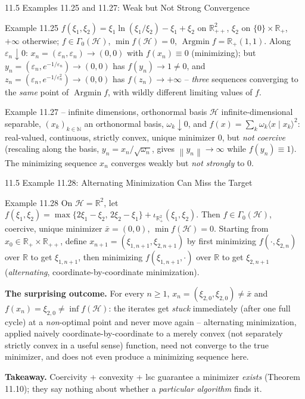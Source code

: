 \documentclass[aspectratio=169,10pt]{beamer}
\newcommand{\mHH}{\mathcal H}
\newcommand{\inner}[2]{\langle #1 \mid #2 \rangle}
\newcommand{\norm}[1]{\left\|#1\right\|}
\newcommand{\R}{\mathbb{R}}
\newcommand{\Rp}{\mathbb{R}_{+}}
\newcommand{\Rpp}{\mathbb{R}_{++}}
\newcommand{\Argmin}{\operatorname{Argmin}}
\newcommand{\GamZero}{\Gamma_0(\mHH)}
\begin{document}
\begin{frame}{11.5 Examples 11.25 and 11.27: Weak but Not Strong Convergence}

  \begin{block}{Example 11.25}
    $f(\xi_1,\xi_2)=\xi_1\ln(\xi_1/\xi_2)-\xi_1+\xi_2$ on
    $\R_{++}^2$, $\xi_2$ on $\{0\}\times\Rp$, $+\infty$ otherwise;
    $f\in\GamZero$, $\min f(\mHH)=0$, $\Argmin f=\Rp(1,1)$. Along
    $\varepsilon_n\downarrow0$: $x_n=(\varepsilon_n,\varepsilon_n)\to(0,0)$
    with $f(x_n)\equiv0$ (minimizing); but
    $y_n=(\varepsilon_n,e^{-1/\varepsilon_n})\to(0,0)$ has
    $f(y_n)\to1\neq0$, and $z_n=(\varepsilon_n,e^{-1/\varepsilon_n^2})\to(0,0)$
    has $f(z_n)\to+\infty$ -- \emph{three} sequences converging to the
    \emph{same} point of $\Argmin f$, with wildly different limiting
    values of $f$.
  \end{block}

  \begin{block}{Example 11.27 -- infinite dimensions, orthonormal basis}
    $\mHH$ infinite-dimensional separable, $(x_k)_{k\in\mathbb N}$ an
    orthonormal basis, $\omega_k\downarrow0$, and
    $f(x)=\sum_k\omega_k\inner{x}{x_k}^2$: real-valued, continuous,
    strictly convex, unique minimizer $0$, but \emph{not coercive}
    (rescaling along the basis, $y_n=x_n/\sqrt{\omega_n}$, gives
    $\norm{y_n}\to\infty$ while $f(y_n)\equiv1$). The minimizing
    sequence $x_n$ converges weakly but \emph{not strongly} to $0$.
  \end{block}

\end{frame}

\begin{frame}{11.5 Example 11.28: Alternating Minimization Can Miss the Target}

  \begin{block}{Example 11.28}
    On $\mHH=\R^2$, let
    $f(\xi_1,\xi_2)=\max\{2\xi_1-\xi_2,\,2\xi_2-\xi_1\}+\iota_{\Rp^2}(\xi_1,\xi_2)$.
    Then $f\in\GamZero$, coercive, unique minimizer $\bar x=(0,0)$,
    $\min f(\mHH)=0$. Starting from $x_0\in\Rp\times\Rpp$, define
    $x_{n+1}=(\xi_{1,n+1},\xi_{2,n+1})$ by first minimizing
    $f(\cdot,\xi_{2,n})$ over $\R$ to get $\xi_{1,n+1}$, then
    minimizing $f(\xi_{1,n+1},\cdot)$ over $\R$ to get $\xi_{2,n+1}$
    (\emph{alternating}, coordinate-by-coordinate minimization).
  \end{block}

  \textbf{The surprising outcome.} For every $n\ge1$,
  $x_n=(\xi_{2,0},\xi_{2,0})\neq\bar x$ and
  $f(x_n)=\xi_{2,0}\neq\inf f(\mHH)$: the iterates get \emph{stuck}
  immediately (after one full cycle) at a \emph{non}-optimal point
  and never move again -- alternating minimization, applied naively
  coordinate-by-coordinate to a merely convex (not separately strictly
  convex in a useful sense) function, need not converge to the true
  minimizer, and does not even produce a minimizing sequence here.

  \textbf{Takeaway.} Coercivity + convexity + lsc guarantee a
  minimizer \emph{exists} (Theorem 11.10); they say nothing about
  whether a \emph{particular algorithm} finds it.

\end{frame}
\end{document}
